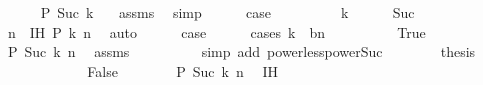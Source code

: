 \begin{isabellebody}
\ \ \ \ \isamarkupfalse%
\ {\isachardoublequoteopen}{\isacharquery}{\kern0pt}P\ {\isacharparenleft}{\kern0pt}Suc\ k{\isacharparenright}{\kern0pt}\ {}{\isachardoublequoteclose}\ \isamarkupfalse%
\ assms\ \isamarkupfalse%
\ simp\isanewline
\ \ \ \ \isamarkupfalse%
\ {\isacharquery}{\kern0pt}case\ \isacommand{{\isachardot}{\kern0pt}{\isachardot}{\kern0pt}}\isamarkupfalse%
\isanewline
\ \ \isamarkupfalse%
\isanewline
\ \ \ \ \isamarkupfalse%
\ {\isachardoublequoteopen}k{\isasymnoteq}{}{\isachardoublequoteclose}\isanewline
\ \ \ \ \isamarkupfalse%
\ Suc\ \isamarkupfalse%
\ n\ \ IH{\isacharcolon}{\kern0pt}\ {\isachardoublequoteopen}{\isacharquery}{\kern0pt}P\ k\ n{\isachardoublequoteclose}\ \isamarkupfalse%
\ auto\isanewline
\ \ \ \ \isamarkupfalse%
\ {\isacharquery}{\kern0pt}case\isanewline
\ \ \ \ \isamarkupfalse%
\ {\isacharparenleft}{\kern0pt}cases\ {\isachardoublequoteopen}k\ {\isacharequal}{\kern0pt}\ b{\isacharcircum}{\kern0pt}{\isacharparenleft}{\kern0pt}n{\isacharplus}{\kern0pt}{}{\isacharparenright}{\kern0pt}\ {\isacharminus}{\kern0pt}\ {}{\isachardoublequoteclose}{\isacharparenright}{\kern0pt}\isanewline
\ \ \ \ \ \ \isamarkupfalse%
\ True\isanewline
\ \ \ \ \ \ \isamarkupfalse%
\ {\isachardoublequoteopen}{\isacharquery}{\kern0pt}P\ {\isacharparenleft}{\kern0pt}Suc\ k{\isacharparenright}{\kern0pt}\ {\isacharparenleft}{\kern0pt}n{\isacharplus}{\kern0pt}{}{\isacharparenright}{\kern0pt}{\isachardoublequoteclose}\ \isamarkupfalse%
\ assms\isanewline
\ \ \ \ \ \ \ \ \isamarkupfalse%
\ {\isacharparenleft}{\kern0pt}simp\ add{\isacharcolon}{\kern0pt}\ power{\isacharunderscore}{\kern0pt}less{\isacharunderscore}{\kern0pt}power{\isacharunderscore}{\kern0pt}Suc{\isacharparenright}{\kern0pt}\isanewline
\ \ \ \ \ \ \isamarkupfalse%
\ {\isacharquery}{\kern0pt}thesis\ \isacommand{{\isachardot}{\kern0pt}{\isachardot}{\kern0pt}}\isamarkupfalse%
\isanewline
\ \ \ \ \isamarkupfalse%
\isanewline
\ \ \ \ \ \ \isamarkupfalse%
\ False\isanewline
\ \ \ \ \ \ \isamarkupfalse%
\ {\isachardoublequoteopen}{\isacharquery}{\kern0pt}P\ {\isacharparenleft}{\kern0pt}Suc\ k{\isacharparenright}{\kern0pt}\ n{\isachardoublequoteclose}\ \isamarkupfalse%
\ IH\ \isamarkupfalse%

\end{isabellebody}
